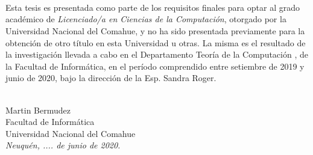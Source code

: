 \ \\
\ \\
\label{pagpref}
\\
\ \\
\ \\

\ \\

\ \\
\ \\


Esta tesis es presentada como parte de los requisitos finales para optar al grado acad\'emico de 
{\em Licenciado/a en Ciencias de la Computación}, 
otorgado por la Universidad Nacional del Comahue, y no ha sido presentada previamente para la 
obtención de otro título en esta Universidad u otras. La misma es el resultado de la investigación 
llevada a cabo en el Departamento Teoría de la Computación%
, de la Facultad de Informática, en el período comprendido entre setiembre de
2019 y junio de 2020, bajo la dirección de la Esp. Sandra Roger.%




\vspace{3cm}


\ \\
{\flushright Martin Bermudez\\
{\sc Facultad de Informática \\
Universidad Nacional del Comahue}\\
{\em Neuqu\'en, .... de junio de 2020.}\\}

\vfill

